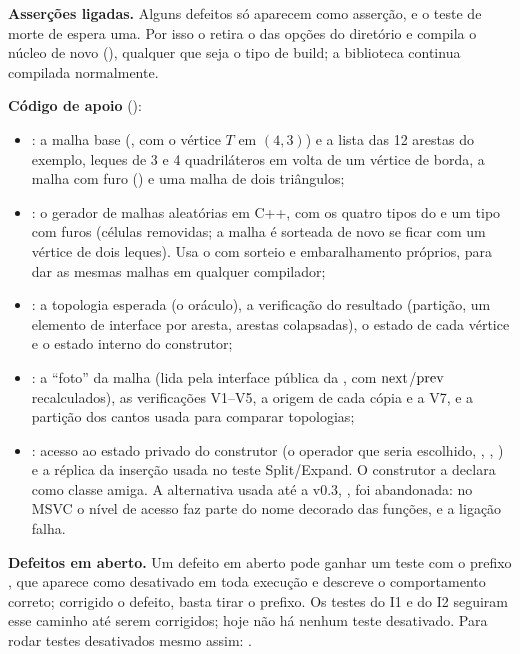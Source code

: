\textbf{Asserções ligadas.} Alguns defeitos só aparecem como asserção, e o teste de morte de  espera uma.
Por isso o  retira o  das opções do diretório e compila o núcleo de novo
(), qualquer que seja o tipo de build; a biblioteca 
continua compilada normalmente.

\textbf{Código de apoio} ():
\begin{itemize}
\item {}: a malha base (, com o vértice $T$ em $(4,3)$) e a lista das 12 arestas do
exemplo, leques de 3 e 4 quadriláteros em volta de um vértice de borda, a malha com furo () e uma
malha de dois triângulos;
\item {}: o gerador de malhas aleatórias em C++, com os quatro tipos do  e um tipo com
furos (células removidas; a malha é sorteada de novo se ficar com um vértice de dois leques). Usa o 
com sorteio e embaralhamento próprios, para dar as mesmas malhas em qualquer compilador;
\item {}: a topologia esperada (o oráculo), a verificação do resultado (partição, um elemento de
interface por aresta, arestas colapsadas), o estado de cada vértice e o estado interno do construtor;
\item {}: a ``foto'' da malha (lida pela interface pública da , com $\mathrm{next}$/$\mathrm{prev}$
recalculados), as verificações V1--V5, a origem de cada cópia e a V7, e a partição dos cantos usada para comparar
topologias;
\item {}: acesso ao estado privado do construtor (o operador que seria escolhido,
, , ) e a réplica da inserção usada no teste
Split/Expand. O construtor a declara como classe amiga. A alternativa usada até a v0.3, , foi abandonada: no MSVC o nível de acesso faz
parte do nome decorado das funções, e a ligação falha.
\end{itemize}

\textbf{Defeitos em aberto.} Um defeito em aberto pode ganhar um teste com o prefixo , que aparece
como desativado em toda execução e descreve o comportamento correto; corrigido o defeito, basta tirar o prefixo. Os
testes do I1 e do I2 seguiram esse caminho até serem corrigidos; hoje não há nenhum teste desativado. Para rodar testes
desativados mesmo assim: .

